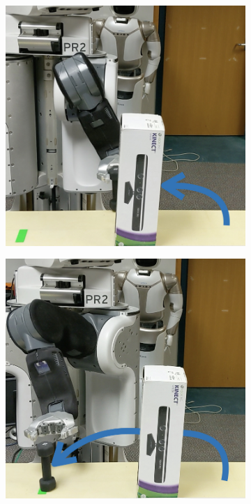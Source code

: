 \begin{figure}[t]
\begin{subfigure}{0.13\linewidth}
  \end{subfigure}
  \begin{subfigure}{0.13\linewidth}
    \includegraphics[width=\linewidth]{figures/cmax/pr2_pick_place_heavy_2_annotated.jpeg}
  \end{subfigure}
  \begin{subfigure}{0.13\linewidth}
    \includegraphics[width=\linewidth]{figures/cmax/pr2_pick_place_heavy_3_annotated.jpeg}

\end{subfigure}
\end{figure}
